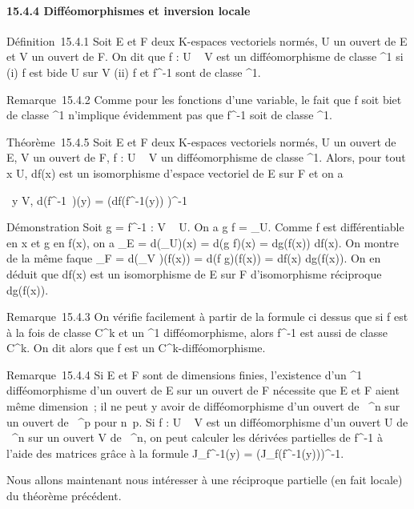\documentclass[]{article}
\begin{document}
\paragraph{15.4.4 Difféomorphismes et inversion locale}

Définition~15.4.1 Soit E et F deux K-espaces vectoriels normés, U un
ouvert de E et V un ouvert de F. On dit que f : U \rightarrow~ V est un
difféomorphisme de classe ^1 si (i) f est bi\jmathective de U sur
V (ii) f et f^-1 sont de classe ^1.

Remarque~15.4.2 Comme pour les fonctions d'une variable, le fait que f
soit bi\jmathective et de classe ^1 n'implique évidemment pas que
f^-1 soit de classe ^1.

Théorème~15.4.5 Soit E et F deux K-espaces vectoriels normés, U un
ouvert de E, V un ouvert de F, f : U \rightarrow~ V un difféomorphisme de classe
^1. Alors, pour tout x \in U, df(x) est un isomorphisme
d'espace vectoriel de E sur F et on a

\forall~y \in V, d(f^-1~)(y) =
\left (df(f^-1(y))\right
)^-1

Démonstration Soit g = f^-1 : V \rightarrow~ U. On a g \cdot f =
\mathrmId\_U. Comme f est différentiable en x
et g en f(x), on a \mathrmId\_E =
d(\mathrmId\_U)(x) = d(g \cdot f)(x) = dg(f(x)) \cdot
df(x). On montre de la même fa\ccon que
\mathrmId\_F =
d(\mathrmId\_V )(f(x)) = d(f \cdot g)(f(x)) =
df(x) \cdot dg(f(x)). On en déduit que df(x) est un isomorphisme de E sur F
d'isomorphisme réciproque dg(f(x)).

Remarque~15.4.3 On vérifie facilement à partir de la formule ci dessus
que si f est à la fois de classe C^k et un ^1
difféomorphisme, alors f^-1 est aussi de classe
C^k. On dit alors que f est un
C^k-difféomorphisme.

Remarque~15.4.4 Si E et F sont de dimensions finies, l'existence d'un
^1 difféomorphisme d'un ouvert de E sur un ouvert de F
nécessite que E et F aient même dimension~; il ne peut y avoir de
difféomorphisme d'un ouvert de ~^n sur un ouvert de
~^p pour n\neq~p. Si f : U \rightarrow~ V est un
difféomorphisme d'un ouvert U de ~^n sur un ouvert V de
~^n, on peut calculer les dérivées partielles de
f^-1 à l'aide des matrices \jmathacobiennes grâce à la formule
J\_f^-1(y) = \left
(J\_f(f^-1(y))\right )^-1.

Nous allons maintenant nous intéresser à une réciproque partielle (en
fait locale) du théorème précédent.
\end{document}
